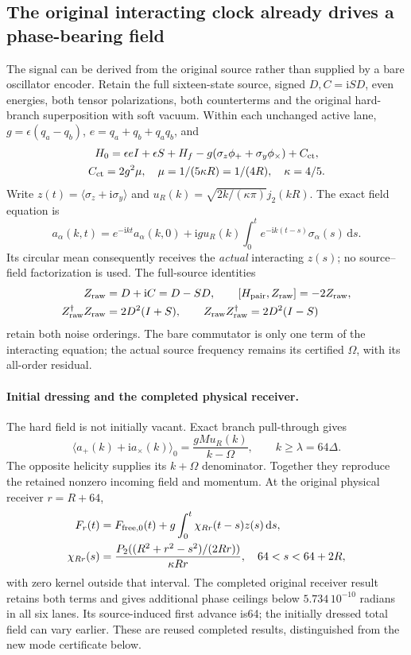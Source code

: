 \documentclass[10pt,twocolumn,letterpaper]{article}
\newcommand{\dd}{\mathrm{d}}
\begin{document}
\subsection{The original interacting clock already drives a phase-bearing field}
The signal can be derived from the original source rather than supplied by
a bare oscillator encoder. Retain the full sixteen-state source, signed
$D,C=\mathrm{i}SD$, even energies, both tensor polarizations, both
counterterms and the original hard-branch superposition with soft vacuum.
Within each unchanged active lane, $g=\epsilon(q_a-q_b)$,
$e=q_a+q_b+q_aq_b$, and
\[
 \begin{gathered}
 H_0=\epsilon e I+\epsilon S+H_f
       -g(\sigma_z\phi_++\sigma_y\phi_\times)+C_{\rm ct},\\
 C_{\rm ct}=2g^2\mu,\quad
 \mu=1/(5\kappa R)=1/(4R),\quad\kappa=4/5.
 \end{gathered}
\]
Write $z(t)=\langle\sigma_z+\mathrm{i}\sigma_y\rangle$ and
$u_R(k)=\sqrt{2k/(\kappa\pi)}j_2(kR)$. The exact field equation is
\[
 a_\alpha(k,t)=e^{-\mathrm{i}kt}a_\alpha(k,0)
     +\mathrm{i}g u_R(k)\int_0^t
            e^{-\mathrm{i}k(t-s)}\sigma_\alpha(s)\,\dd s.
\]
Its circular mean consequently receives the \emph{actual} interacting
$z(s)$; no source--field factorization is used. The full-source identities
\[
 \begin{split}
 Z_{\rm raw}&=D+\mathrm{i}C=D-SD,\qquad
 [H_{\rm pair},Z_{\rm raw}]=-2Z_{\rm raw},\\
 Z_{\rm raw}^\dagger Z_{\rm raw}&=2D^2(I+S),\qquad
 Z_{\rm raw}Z_{\rm raw}^\dagger=2D^2(I-S)
 \end{split}
\]
retain both noise orderings. The bare commutator is only one term of the
interacting equation; the actual source frequency remains its certified
$\Omega$, with its all-order residual.

\paragraph{Initial dressing and the completed physical receiver.}
The hard field is not initially vacant. Exact branch pull-through gives
\[
 \langle a_+(k)+\mathrm{i}a_\times(k)\rangle_0
       =\frac{gM u_R(k)}{k-\Omega},\qquad k\ge\lambda=64\Delta.
\]
The opposite helicity supplies its $k+\Omega$ denominator. Together they
reproduce the retained nonzero incoming field and momentum. At the original
physical receiver $r=R+64$,
\[
 \begin{split}
 F_r(t)&=F_{{\rm free},0}(t)+g\int_0^t\chi_{Rr}(t-s)z(s)\,\dd s,\\
 \chi_{Rr}(s)&=\frac{P_2((R^2+r^2-s^2)/(2Rr))}{\kappa Rr},
                 \quad64<s<64+2R,
 \end{split}
\]
with zero kernel outside that interval. The completed original receiver
result retains both terms and gives additional phase ceilings below
$5.734\,10^{-10}$ radians in all six lanes. Its source-induced first
advance is64; the initially dressed total field can vary earlier.
These are reused completed results, distinguished from the new mode
certificate below.
\end{document}
